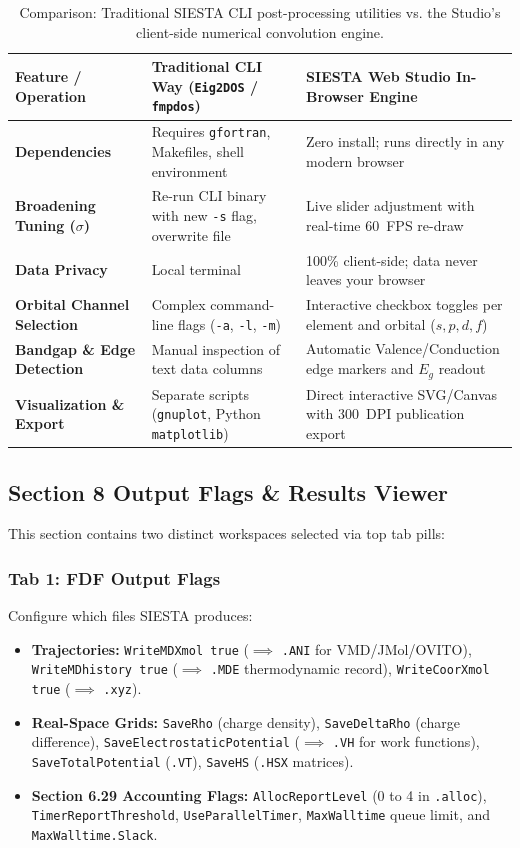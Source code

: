\documentclass[11pt,a4paper]{article}
\begin{document}
\begin{table}[h!]
\centering
\small
\begin{tabular}{@{}lll@{}}
\toprule
\textbf{Feature / Operation} & \textbf{Traditional CLI Way (\texttt{Eig2DOS} / \texttt{fmpdos})} & \textbf{SIESTA Web Studio In-Browser Engine} \\
\midrule
\textbf{Dependencies} & Requires \texttt{gfortran}, Makefiles, shell environment & Zero install; runs directly in any modern browser \\
\textbf{Broadening Tuning ($\sigma$)} & Re-run CLI binary with new \texttt{-s} flag, overwrite file & Live slider adjustment with real-time 60~FPS re-draw \\
\textbf{Data Privacy} & Local terminal & 100\% client-side; data never leaves your browser \\
\textbf{Orbital Channel Selection} & Complex command-line flags (\texttt{-a}, \texttt{-l}, \texttt{-m}) & Interactive checkbox toggles per element and orbital ($s, p, d, f$) \\
\textbf{Bandgap \& Edge Detection} & Manual inspection of text data columns & Automatic Valence/Conduction edge markers and $E_g$ readout \\
\textbf{Visualization \& Export} & Separate scripts (\texttt{gnuplot}, Python \texttt{matplotlib}) & Direct interactive SVG/Canvas with 300~DPI publication export \\
\bottomrule
\end{tabular}
\caption{Comparison: Traditional SIESTA CLI post-processing utilities vs. the Studio's client-side numerical convolution engine.}
\end{table}

\subsection{Section 8 Output Flags \& Results Viewer}
This section contains two distinct workspaces selected via top tab pills:

\subsubsection{Tab 1: FDF Output Flags}
Configure which files SIESTA produces:
\begin{itemize}[leftmargin=*]
 \item \textbf{Trajectories:} \texttt{WriteMDXmol true} ($\implies$ \texttt{.ANI} for VMD/JMol/OVITO), \texttt{WriteMDhistory true} ($\implies$ \texttt{.MDE} thermodynamic record), \texttt{WriteCoorXmol true} ($\implies$ \texttt{.xyz}).
 \item \textbf{Real-Space Grids:} \texttt{SaveRho} (charge density), \texttt{SaveDeltaRho} (charge difference), \texttt{SaveElectrostaticPotential} ($\implies$ \texttt{.VH} for work functions), \texttt{SaveTotalPotential} (\texttt{.VT}), \texttt{SaveHS} (\texttt{.HSX} matrices).
 \item \textbf{Section 6.29 Accounting Flags:} \texttt{AllocReportLevel} (0 to 4 in \texttt{.alloc}), \texttt{TimerReportThreshold}, \texttt{UseParallelTimer}, \texttt{MaxWalltime} queue limit, and \texttt{MaxWalltime.Slack}.
\end{itemize}
\end{document}
